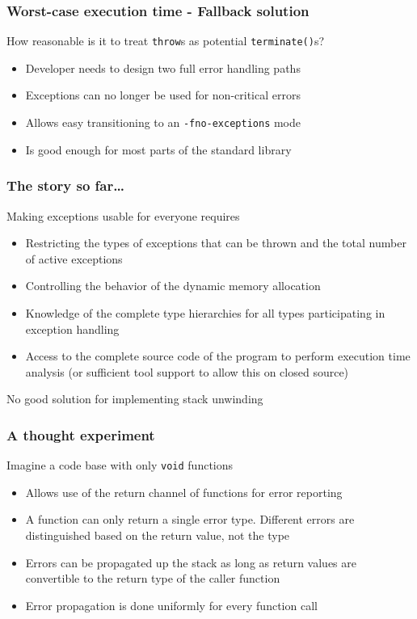 \documentclass[aspectratio=169]{beamer}
\begin{document}
\begin{frame}
\frametitle{Worst-case execution time - Fallback solution}

How reasonable is it to treat \texttt{throw}s as potential \texttt{terminate()}s?

\begin{itemize}
\pause \item Developer needs to design two full error handling paths
\pause \item Exceptions can no longer be used for non-critical errors
\pause \item Allows easy transitioning to an \texttt{-fno-exceptions} mode
\pause \item Is good enough for most parts of the standard library
\end{itemize}

\end{frame}


\begin{frame}
  \frametitle{The story so far\ldots}

  Making exceptions usable for everyone requires
  \begin{itemize}
  \pause \item Restricting the types of exceptions that can be thrown and the total number of active exceptions
  \pause \item Controlling the behavior of the dynamic memory allocation
  \pause \item Knowledge of the complete type hierarchies for all types participating in exception handling
  \pause \item Access to the complete source code of the program to perform execution time analysis (or sufficient tool support to allow this on closed source)
  \end{itemize}

 \pause 
  No good solution for implementing stack unwinding
\end{frame}


\begin{frame}
  \frametitle{A thought experiment}

  Imagine a code base with only \texttt{void} functions
  \begin{itemize}
  \pause \item Allows use of the return channel of functions for error reporting
  \pause \item A function can only return a single error type. Different errors are distinguished based on the return value, not the type
  \pause \item Errors can be propagated up the stack as long as return values are convertible to the return type of the caller function
  \pause \item Error propagation is done uniformly for every function call
  \end{itemize}
\end{frame}
\end{document}
